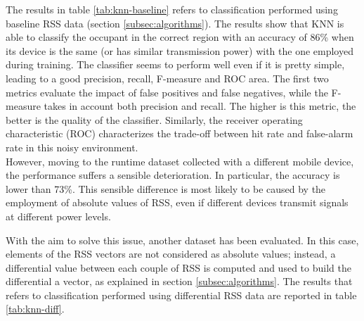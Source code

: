 The results in table \ref{tab:knn-baseline} refers to classification performed using baseline RSS data (section \ref{subsec:algorithms}). The results show that KNN is able to classify the occupant in the correct region with an accuracy of 86\% when its device is the same (or has similar transmission power) with the one employed during training. The classifier seems to perform well even if it is pretty simple, leading to a good precision, recall, F-measure and ROC area. The first two metrics evaluate the impact of false positives and false negatives, while the F-measure takes in account both precision and recall. The higher is this metric, the better is the quality of the classifier. Similarly, the receiver operating characteristic (ROC) characterizes the trade-off between hit rate and false-alarm rate in this noisy environment.\\
However, moving to the runtime dataset collected with a different mobile device, the performance suffers a sensible deterioration. In particular, the accuracy is lower than 73\%. This sensible difference is most likely to be caused by the employment of absolute values of RSS, even if different devices transmit signals at different power levels.

\medskip
With the aim to solve this issue, another dataset has been evaluated. In this case, elements of the RSS vectors are not considered as absolute values; instead, a differential value between each couple of RSS is computed and used to build the differential a vector, as explained in section \ref{subsec:algorithms}.
The results that refers to classification performed using differential RSS data are reported in table \ref{tab:knn-diff}.

